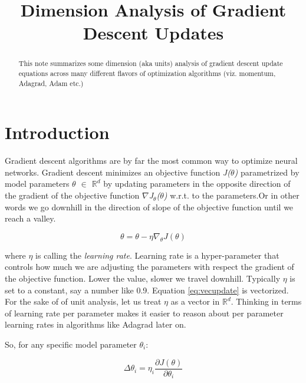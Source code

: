 \documentclass{article}
\title{Dimension Analysis of Gradient Descent Updates}
\begin{document}
\maketitle

\begin{abstract}
	This note summarizes some dimension (aka units) analysis of gradient descent update equations across many different flavors of optimization algorithms (viz. momentum, Adagrad, Adam etc.)
\end{abstract}

\section{Introduction}
	Gradient descent algorithms are by far the most common way to optimize neural networks. Gradient descent minimizes an objective function {\itshape J($\theta$)} parametrized by model parameters {\itshape $\theta$ $\in$ $\mathbb{R}^{d}$} by updating parameters in the opposite direction of the gradient of the objective function {\itshape $\nabla$J$_{\theta}$($\theta$)} w.r.t. to the parameters.Or in other words we go downhill in the direction of slope of the objective function until we reach a valley.
	
	\begin{center}	{\itshape \begin{equation}	\theta = \theta - \eta \nabla_{\theta} J(\theta) \label{eq:vecupdate}	\end{equation}}	\end{center}
	
	where $\eta$ is calling the {\itshape learning rate}. Learning rate is a hyper-parameter that controls how much we are adjusting the parameters with respect the gradient of the objective function. Lower the value, slower we travel downhill. Typically $\eta$ is set to a constant, say a number like 0.9. Equation \ref{eq:vecupdate} is vectorized. For the sake of of unit analysis, let us treat $\eta$ as a vector in $\mathbb{R}^{d}$. Thinking in terms of learning rate per parameter makes it easier to reason about per parameter learning rates in algorithms like Adagrad later on. 

	
	So, for any specific model parameter $\theta_{i}$:
	
	\begin{center} \begin{equation}	\Delta \theta_{i} = \eta_{i} \frac{\partial J(\theta)}{\partial \theta_{i}}	\label{eq:singleupdate} \end{equation} \end{center}
	        									
\end{document}

